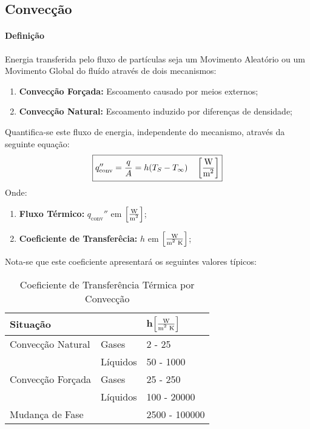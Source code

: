 \documentclass{article}
\begin{document}
        \subsection{Convecção}
            \paragraph{Definição}Energia transferida pelo fluxo de partículas seja um Movimento Aleatório ou um Movimento Global do fluído através de dois mecanismos:
                \begin{enumerate}[noitemsep]
                    \item \textbf{Convecção Forçada:} Escoamento causado por meios externos; 
                    \item \textbf{Convecção Natural:} Escoamento induzido por diferenças de densidade; 
                \end{enumerate}
            Quantifica-se este fluxo de energia, independente do mecanismo, através da seguinte equação:
                \begin{equation}
                    \boxed{
                        q_{\text{conv}}'' = \frac{q}{A} = h (T_{S} - T_{\infty})
                        \quad 
                        \left[\frac{\text{W}}{\text{m\textsuperscript{2}}}\right]
                    }
                \end{equation}
            Onde:
                \begin{enumerate}[noitemsep, rightmargin = \leftmargin]
                    \item \textbf{Fluxo Térmico:} $q_{\text{conv}}''$ em $\left[\frac{\text{W}}{\text{m\textsuperscript{2}}}\right]$;

                    \item \textbf{Coeficiente de Transferêcia:} $h$ em $\left[\frac{\text{W}}{\text{m\textsuperscript{2} K}}\right]$;
                \end{enumerate}
            Nota-se que este coeficiente apresentará os seguintes valores típicos:
                \begin{table}[H]
                    \centering
                    \begin{tabular}{lll}\hline
                        Situação          &          & h\;$\left[\frac{\text{W}}{\text{m\textsuperscript{2} K}}\right]$\\\hline
                        Convecção Natural & Gases    & 2 - 25\\
                                          & Líquidos & 50 - 1000\\
                        Convecção Forçada & Gases    & 25 - 250\\
                                          & Líquidos & 100 - 20000\\
                        Mudança de Fase   &          & 2500 - 100000\\\hline
                    \end{tabular}
                    \caption{Coeficiente de Transferência Térmica por Convecção}
                    \label{table:convectionConstant}
                \end{table}\noindent
\end{document}
